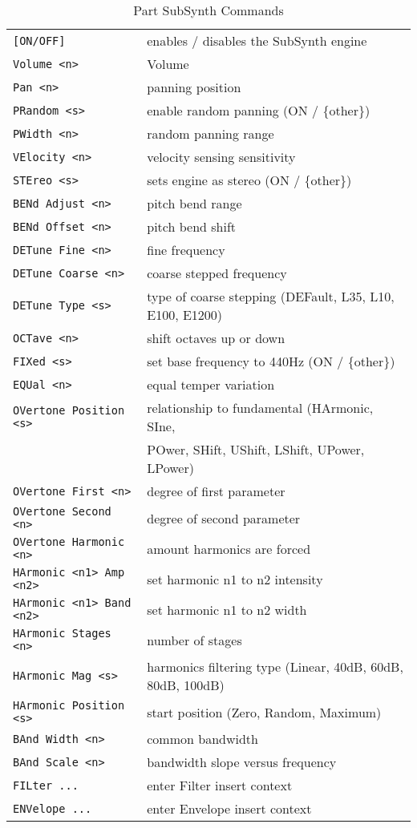    \begin{table}[H]
      \centering
      \caption{Part SubSynth Commands}
      \label{table:yoshimi_part_subsynth_commands}
      \begin{tabular}{l l}
\texttt{[ON/OFF]} &
   enables / disables the SubSynth engine \\
\texttt{Volume <n>} &
   Volume \\
\texttt{Pan <n>} &
   panning position \\
\texttt{PRandom <s>} &
   enable random panning (ON / \{other\}) \\
\texttt{PWidth <n>} &
   random panning range\\
\texttt{VElocity <n>} &
   velocity sensing sensitivity \\
\texttt{STEreo <s>} &
   sets engine as stereo (ON / \{other\}) \\
\texttt{BENd Adjust <n>} &
   pitch bend range \\
\texttt{BENd Offset <n>} &
   pitch bend shift \\
\texttt{DETune Fine <n>} &
   fine frequency \\
\texttt{DETune Coarse <n>} &
   coarse stepped frequency \\
\texttt{DETune Type <s>} &
   type of coarse stepping (DEFault, L35, L10, E100, E1200) \\
\texttt{OCTave <n>} &
   shift octaves up or down \\
\texttt{FIXed <s>} &
   set base frequency to 440Hz (ON / \{other\}) \\
\texttt{EQUal <n>} &
   equal temper variation \\
\texttt{OVertone Position <s>} &
   relationship to fundamental (HArmonic, SIne,\\
\texttt{} &
   POwer, SHift, UShift, LShift, UPower, LPower)\\
\texttt{OVertone First <n>} &
   degree of first parameter \\
\texttt{OVertone Second <n>} &
   degree of second parameter \\
\texttt{OVertone Harmonic <n>} &
   amount harmonics are forced  \\
\texttt{HArmonic <n1> Amp <n2>} &
   set harmonic n1 to n2 intensity \\
\texttt{HArmonic <n1> Band <n2>} &
   set harmonic n1 to n2 width \\
\texttt{HArmonic Stages <n>} &
   number of stages \\
\texttt{HArmonic Mag <s>} &
   harmonics filtering type (Linear, 40dB, 60dB, 80dB, 100dB)\\
\texttt{HArmonic Position <s>} &
   start position (Zero, Random, Maximum)\\
\texttt{BAnd Width <n>} &
   common bandwidth \\
\texttt{BAnd Scale <n>} &
   bandwidth slope versus frequency \\
\texttt{FILter ...} &
   enter Filter insert context \\
\texttt{ENVelope ...} &
   enter Envelope insert context \\
      \end{tabular}
   \end{table}

